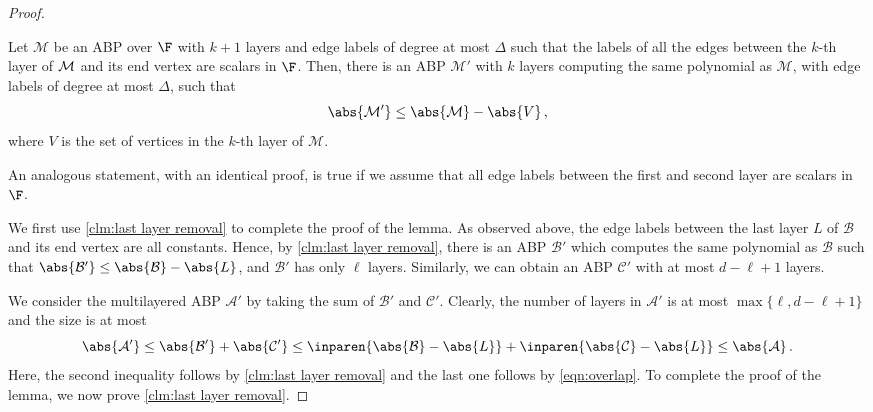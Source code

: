 \begin{proof}
	\begin{claim}\label{clm:last layer removal}
		Let ${\mathcal{M}}$ be an ABP over $\F$ with $k+1$ layers and edge labels of degree at most $\Delta$ such that the labels of all the edges between the $k$-th layer of ${\cal M}$ and its end vertex are scalars in $\F$. Then, there is an ABP $\mathcal{M}'$ with  $k$ layers computing the same polynomial as $\mathcal{M}$, with edge labels of degree at most $\Delta$, such that
		\[\abs{\mathcal{M}'} \leq \abs{\mathcal{M}} - \abs{V} \, , \]
		where $V$ is the set of vertices in the $k$-th layer of $\mathcal{M}$.
	\end{claim}
	
	An analogous statement, with an identical proof, is true if we assume that all edge labels between the first and second layer are scalars in $\F$.

	We first use \autoref{clm:last layer removal} to complete the proof of the lemma. As observed above, the edge labels between the last layer $L$ of $\mathcal{B}$ and its end vertex are all constants. Hence, by \autoref{clm:last layer removal}, there is an ABP $\mathcal{B}'$ which computes the same polynomial as $\mathcal{B}$ such that $\abs{\mathcal{B}'} \leq \abs{\mathcal{B}} - \abs{L}$, and $\mathcal{B}'$ has only $\ell$ layers. Similarly, we can obtain an ABP $\mathcal{C}'$ with at most $d-\ell+1$ layers.
	
	We consider the multilayered ABP $\mathcal{A}'$ by taking the sum of $\mathcal{B}'$ and $\mathcal{C}'$. Clearly, the number of layers in $\mathcal{A}'$ is at most $\max\{\ell, d-\ell+1\}$ and the size is at most 
	\[\abs{\mathcal{A}'} \leq  \abs{\mathcal{B}'} + \abs{\mathcal{C'}} \leq  \inparen{\abs{\mathcal{B}} - \abs{L}} + \inparen{\abs{\mathcal{C} }- \abs{L}} \leq \abs{\mathcal{A}} \, .\]
	Here, the second inequality follows by \autoref{clm:last layer removal} and the last one follows by \autoref{eqn:overlap}. To complete the proof of the lemma, we now prove \autoref{clm:last layer removal}. 
\end{proof}
	
